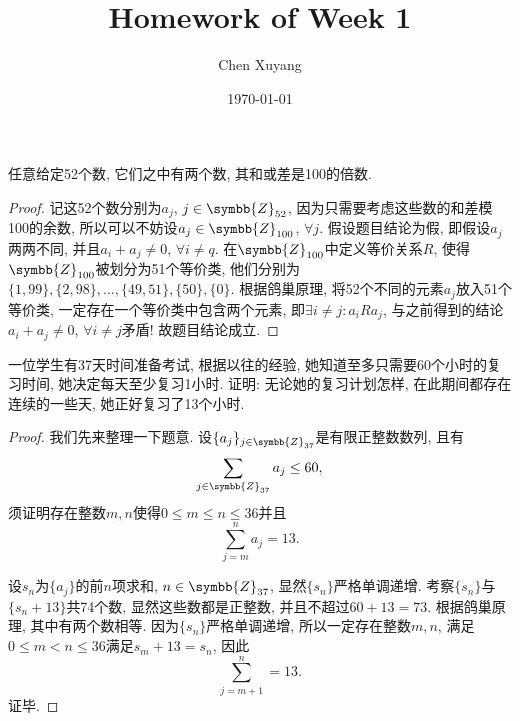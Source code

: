 \documentclass[chinese]{assignment}[2019/10/15]
\title{Homework of Week 1}
\author{Chen Xuyang}
\date{\today}
\institute{School of Mathematical Science}
\newcommand{\BZ}{\symbb{Z}}
\begin{document}
    \maketitle
    \begin{problem}
        任意给定52个数, 它们之中有两个数, 其和或差是100的倍数.
    \end{problem}
    \begin{proof}
        记这52个数分别为$a_j$, $j\in \BZ_{52}$, 因为只需要考虑这些数的和差模100的余数, 所以可以不妨设$a_j\in \BZ_{100}$, $\forall j$. 假设题目结论为假, 即假设$a_j$两两不同, 并且$a_i+a_j\neq 0$, $\forall i\neq q$. 在$\BZ_{100}$中定义等价关系$R$, 使得$\BZ_{100}$被划分为51个等价类, 他们分别为$\{1, 99\}, \{2, 98\}, \dotsc, \{49, 51\}, \{50\}, \{0\}$. 根据鸽巢原理, 将52个不同的元素$a_j$放入51个等价类, 一定存在一个等价类中包含两个元素, 即$\exists i\neq j: a_iRa_j$, 与之前得到的结论$a_i+a_j\neq 0$, $\forall i\neq j$矛盾! 故题目结论成立.
    \end{proof}

    \begin{problem}
        一位学生有37天时间准备考试, 根据以往的经验, 她知道至多只需要60个小时的复习时间, 她决定每天至少复习1小时. 证明: 无论她的复习计划怎样, 在此期间都存在连续的一些天, 她正好复习了13个小时.
    \end{problem}
    \begin{proof}
        我们先来整理一下题意. 设$\{a_j\}_{j\in \BZ_{37}}$是有限正整数数列, 且有
        \begin{equation}
            \sum_{j\in\BZ_{37}}a_j\leq 60,
        \end{equation}
        须证明存在整数$m, n$使得$0\leq m\leq n\leq 36$并且
        \begin{equation}
            \sum_{j=m}^n a_j=13.
        \end{equation}

        设$s_n$为$\{a_j\}$的前$n$项求和, $n\in\BZ_{37}$, 显然$\{s_n\}$严格单调递增. 考察$\{s_n\}$与$\{s_n+13\}$共74个数, 显然这些数都是正整数, 并且不超过$60+13=73$. 根据鸽巢原理, 其中有两个数相等. 因为$\{s_n\}$严格单调递增, 所以一定存在整数$m, n$, 满足$0\leq m<n\leq 36$满足$s_m+13=s_n$, 因此
        \begin{equation}
            \sum_{j=m+1}^{n}=13.
        \end{equation}
        证毕.
    \end{proof}
\end{document}
